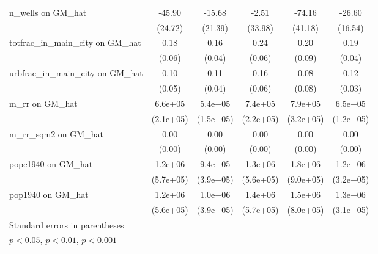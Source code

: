 \begin{table}[htbp]
\begin{tabular}{l*{5}{c}}
\addlinespace
n\_wells on GM\_hat&   -45.90         &   -15.68         &    -2.51         &   -74.16         &   -26.60         \\
                &  (24.72)         &  (21.39)         &  (33.98)         &  (41.18)         &  (16.54)         \\
\addlinespace
totfrac\_in\_main\_city on GM\_hat&     0.18\sym{**} &     0.16\sym{***}&     0.24\sym{***}&     0.20\sym{*}  &     0.19\sym{***}\\
                &   (0.06)         &   (0.04)         &   (0.06)         &   (0.09)         &   (0.04)         \\
\addlinespace
urbfrac\_in\_main\_city on GM\_hat&     0.10         &     0.11\sym{**} &     0.16\sym{**} &     0.08         &     0.12\sym{***}\\
                &   (0.05)         &   (0.04)         &   (0.06)         &   (0.08)         &   (0.03)         \\
\addlinespace
m\_rr on GM\_hat  &  6.6e+05\sym{**} &  5.4e+05\sym{***}&  7.4e+05\sym{***}&  7.9e+05\sym{*}  &  6.5e+05\sym{***}\\
                &(2.1e+05)         &(1.5e+05)         &(2.2e+05)         &(3.2e+05)         &(1.2e+05)         \\
\addlinespace
m\_rr\_sqm2 on GM\_hat&     0.00         &     0.00\sym{*}  &     0.00\sym{*}  &     0.00         &     0.00\sym{***}\\
                &   (0.00)         &   (0.00)         &   (0.00)         &   (0.00)         &   (0.00)         \\
\addlinespace
popc1940 on GM\_hat&  1.2e+06\sym{*}  &  9.4e+05\sym{*}  &  1.3e+06\sym{*}  &  1.8e+06\sym{*}  &  1.2e+06\sym{***}\\
                &(5.7e+05)         &(3.9e+05)         &(5.6e+05)         &(9.0e+05)         &(3.2e+05)         \\
\addlinespace
pop1940 on GM\_hat&  1.2e+06\sym{*}  &  1.0e+06\sym{**} &  1.4e+06\sym{*}  &  1.5e+06         &  1.3e+06\sym{***}\\
                &(5.6e+05)         &(3.9e+05)         &(5.7e+05)         &(8.0e+05)         &(3.1e+05)         \\
\bottomrule
\multicolumn{6}{l}{\footnotesize Standard errors in parentheses}\\
\multicolumn{6}{l}{\footnotesize \sym{*} \(p<0.05\), \sym{**} \(p<0.01\), \sym{***} \(p<0.001\)}\\
\end{tabular}
\end{table}
